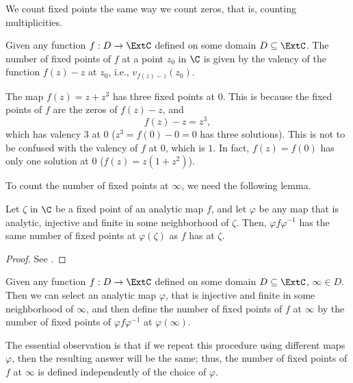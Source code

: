 We count fixed points the same way we count zeros, that is, counting
multiplicities.

\begin{definition}
    Given any function $f : D \to \ExtC$ defined on some domain $D \subseteq
    \ExtC$. The number of fixed points of $f$ at a point $z_0$ in $\C$ is given
    by the valency of the function $f(z) - z$ at $z_0$, i.e., $v_{f(z)-z}(z_0)$.
\end{definition}

\begin{example}
    The map $f(z) = z + z^3$ has three fixed points at $0$. This is because the
    fixed points of $f$ are the zeros of $f(z) - z$, and
    \[
        f(z) - z = z^3,
    \]
    which has valency $3$ at $0$ ($z^3 = f(0) - 0 = 0$ has three solutions).
    This is not to be confused with the valency of $f$ at $0$, which is $1$. In
    fact, $f(z) = f(0)$ has only one solution at $0$ ($f(z) = z(1 + z^2)$).
\end{example}

To count the number of fixed points at $\infty$, we need the following lemma.

\begin{lemma}
    Let $\zeta$ in $\C$ be a fixed point of an analytic map $f$, and let
    $\varphi$ be any map that is analytic, injective and finite in some
    neighborhood of $\zeta$. Then, $\varphi f \varphi^{-1}$ has the same number
    of fixed points at $\varphi(\zeta)$ as $f$ has at $\zeta$.
\end{lemma}
\begin{proof}
    See \cite[39-40]{Beardon1991}.
\end{proof}

\begin{definition}
    Given any function $f : D \to \ExtC$ defined on some domain $D \subseteq
    \ExtC$, $\infty \in D$. Then we can select an analytic map $\varphi$, that
    is injective and finite in some neighborhood of $\infty$, and then define
    the number of fixed points of $f$ at $\infty$ by the number of fixed points
    of $\varphi f \varphi^{-1}$ at $\varphi(\infty)$.
\end{definition}

The essential observation is that if we repeat this procedure using different
maps $\varphi$, then the resulting answer will be the same; thus, the number of
fixed points of $f$ at $\infty$ is defined independently of the choice of
$\varphi$.

